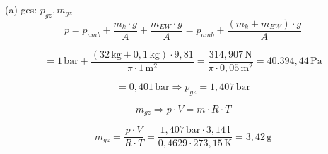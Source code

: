 (a) ges: $p_{gz}, m_{gz}$ \\

\[
p = p_{amb} + \frac{m_k \cdot g}{A} + \frac{m_{EW} \cdot g}{A} = p_{amb} + \frac{(m_k + m_{EW}) \cdot g}{A}
\]

\[
= 1 \, \text{bar} + \frac{(32 \, \text{kg} + 0,1 \, \text{kg}) \cdot 9,81}{\pi \cdot 1 \, \text{m}^2} = \frac{314,907 \, \text{N}}{\pi \cdot 0,05 \, \text{m}^2} = 40.394,44 \, \text{Pa}
\]

\[
= 0,401 \, \text{bar} \Rightarrow p_{gz} = 1,407 \, \text{bar}
\]

\[
m_{gz} \Rightarrow p \cdot V = m \cdot R \cdot T
\]

\[
m_{gz} = \frac{p \cdot V}{R \cdot T} = \frac{1,407 \, \text{bar} \cdot 3,14 \, \text{l}}{0,4629 \cdot 273,15 \, \text{K}} = 3,42 \, \text{g}
\]